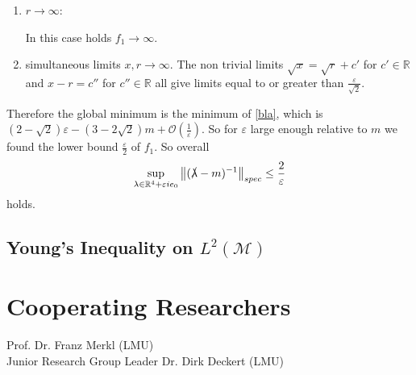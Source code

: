 \documentclass[b5paper,draft,openbib,12pt]{memoir}
\begin{document}
\begin{enumerate}[label=case \alph*),]
\item  \(r\rightarrow \infty\):

In this case holds \(f_1\rightarrow \infty\). 

\item simultaneous limits \(x,r\rightarrow \infty\). The non trivial limits \(\sqrt{x}=\sqrt{r}+c'\) 
for \(c'\in\mathbb{R}\) and \(x-r=c''\) for \(c''\in\mathbb{R}\) all give limits equal to or greater than
\(\frac{\varepsilon}{\sqrt{2}}\). 
 
\end{enumerate}
Therefore the global minimum is the minimum of \ref{bla}, which is 
\((2-\sqrt{2})\varepsilon - (3-2\sqrt{2})m + \mathcal{O}\left(\frac{1}{\varepsilon}\right)\).
So for \(\varepsilon\) large enough relative to \(m\) we found the 
lower bound \(\frac{\varepsilon}{2}\) of \(f_1\). So overall
\begin{equation}
\sup_{\lambda\in \mathbb{R}^4+\varepsilon i e_0} \left\| (\slashed{\lambda} - m)^{-1} \right\|_{spec} \le \frac{2}{\varepsilon}
\end{equation}
holds.


\section{Young's Inequality on \(L^2(\mathcal{M})\)}\label{Sec:Young}



\backmatter


%


%
%

\chapter{Cooperating Researchers} 
Prof. Dr. Franz Merkl (LMU)\\
Junior Research Group Leader Dr. Dirk Deckert (LMU)
\end{document}
